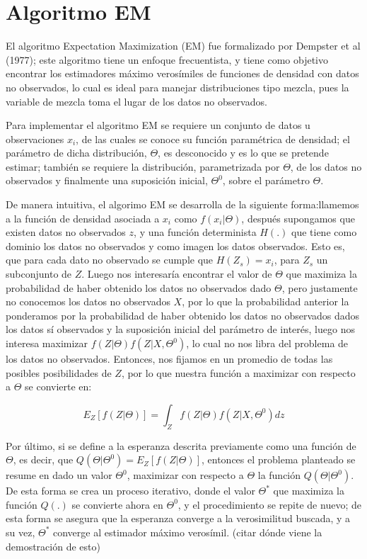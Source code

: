 \chapter{Algoritmo EM}
El algoritmo Expectation Maximization (EM) fue formalizado por Dempster
et al (1977); este algoritmo tiene un enfoque frecuentista, y tiene como objetivo encontrar los estimadores máximo verosímiles de funciones de densidad con datos no observados, lo cual es ideal para manejar distribuciones tipo mezcla, pues la variable de mezcla toma el lugar de los datos no observados.  

Para implementar el algoritmo EM se requiere un conjunto de datos u observaciones $x_{i}$, de las cuales se conoce su función paramétrica de densidad; el parámetro de dicha distribución, $\Theta$, es desconocido y es lo que se pretende estimar; también se requiere la distribución, parametrizada por $\Theta$, de los datos no observados y finalmente una suposición inicial, $\Theta^{0}$, sobre el parámetro $\Theta$. 

De manera intuitiva, el algorimo EM se desarrolla de la siguiente forma:llamemos a la función de densidad asociada a $x_{i}$ como $f(x_{i}|\Theta)$, después supongamos que existen datos no observados $z$, y una función determinista $H(.)$ que tiene como dominio los datos no observados y como imagen los datos observados. Esto es, que para cada dato no observado se cumple que $H(Z_{s})=x_{i}$, para $Z_{s}$ un subconjunto de $Z$. Luego nos interesaría encontrar el valor de $\Theta$ que maximiza la probabilidad
de haber obtenido los datos no observados dado $\Theta$, pero justamente no conocemos los datos no observados $X$, por lo que la probabilidad anterior la ponderamos por la probabilidad de haber obtenido los datos no observados dados los datos sí observados y la suposición inicial del parámetro de interés, luego nos interesa maximizar $f(Z|\Theta ) f(Z|X,\Theta^{0})$, lo cual no nos libra del problema de los datos no observados. Entonces, nos fijamos en un promedio de todas las posibles posibilidades de $Z$, por lo que nuestra función a maximizar con respecto a $\Theta$ se convierte en:

\begin{equation*}
E_{Z}[f(Z|\Theta)]=\int_{Z}f(Z|\Theta)f(Z|X,\Theta^{0})dz
\end{equation*}

Por último, si se define a la esperanza descrita previamente como una función de $\Theta$, es decir, que $Q(\Theta|\Theta^{0})=E_{Z}[f(Z|\Theta)]$, entonces el problema planteado se resume en dado un valor $\Theta^{0}$, maximizar con respecto a $\Theta$ la función $Q(\Theta|\Theta^{0})$. De esta forma se crea un proceso iterativo, donde el valor $\Theta^{*}$ que maximiza la función $Q(.)$ se convierte ahora en $\Theta^{0}$, y el procedimiento se repite de nuevo; de esta forma se asegura que la esperanza converge a la verosimilitud buscada, y a su vez, $\Theta^{*}$ converge al estimador máximo verosímil. (citar dónde viene la demostración de esto)

